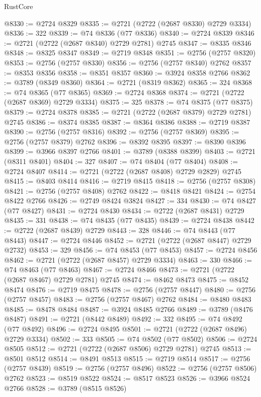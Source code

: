 \begin{lexlean}{RustCore}
\begin{coremodule}
@8330 := @2724 @8329
@8335 := @2721 (@2722 (@2687 @8330) @2729 @3334)
@8336 := 322
@8339 := @74 @8336 (@77 @8336)
@8340 := @2724 @8339
@8346 := @2721 (@2722 (@2687 @8340) @2729 @2781) @2745
@8347 := @8335 @8346
@8348 := @8325 @8347
@8349 := @2719 @8348
@8351 := @2756 (@2757 @8320)
@8353 := @2756 (@2757 @8330)
@8356 := @2756 (@2757 @8340) @2762
@8357 := @8353 @8356
@8358 := @8351 @8357
@8360 := @3924 @8358 @2766
@8362 := @3789 (@8349 @8360)
@8364 := @2721 (@8319 @8362)
@8365 := 324
@8368 := @74 @8365 (@77 @8365)
@8369 := @2724 @8368
@8374 := @2721 (@2722 (@2687 @8369) @2729 @3334)
@8375 := 325
@8378 := @74 @8375 (@77 @8375)
@8379 := @2724 @8378
@8385 := @2721 (@2722 (@2687 @8379) @2729 @2781) @2745
@8386 := @8374 @8385
@8387 := @8364 @8386
@8388 := @2719 @8387
@8390 := @2756 (@2757 @8316)
@8392 := @2756 (@2757 @8369)
@8395 := @2756 (@2757 @8379) @2762
@8396 := @8392 @8395
@8397 := @8390 @8396
@8399 := @3966 @8397 @2766
@8401 := @3789 (@8388 @8399)
@8403 := @2721 (@8311 @8401)
@8404 := 327
@8407 := @74 @8404 (@77 @8404)
@8408 := @2724 @8407
@8414 := @2721 (@2722 (@2687 @8408) @2729 @2829) @2745
@8415 := @8403 @8414
@8416 := @2719 @8415
@8418 := @2756 (@2757 @8308)
@8421 := @2756 (@2757 @8408) @2762
@8422 := @8418 @8421
@8424 := @2754 @8422 @2766
@8426 := @2749 @8424 @3824
@8427 := 334
@8430 := @74 @8427 (@77 @8427)
@8431 := @2724 @8430
@8434 := @2722 (@2687 @8431) @2729
@8435 := 331
@8438 := @74 @8435 (@77 @8435)
@8439 := @2724 @8438
@8442 := @2722 (@2687 @8439) @2729
@8443 := 328
@8446 := @74 @8443 (@77 @8443)
@8447 := @2724 @8446
@8452 := @2721 (@2722 (@2687 @8447) @2729 @2732)
@8453 := 329
@8456 := @74 @8453 (@77 @8453)
@8457 := @2724 @8456
@8462 := @2721 (@2722 (@2687 @8457) @2729 @3334)
@8463 := 330
@8466 := @74 @8463 (@77 @8463)
@8467 := @2724 @8466
@8473 := @2721 (@2722 (@2687 @8467) @2729 @2781) @2745
@8474 := @8462 @8473
@8475 := @8452 @8474
@8476 := @2719 @8475
@8478 := @2756 (@2757 @8447)
@8480 := @2756 (@2757 @8457)
@8483 := @2756 (@2757 @8467) @2762
@8484 := @8480 @8483
@8485 := @8478 @8484
@8487 := @3924 @8485 @2766
@8489 := @3789 (@8476 @8487)
@8491 := @2721 (@8442 @8489)
@8492 := 332
@8495 := @74 @8492 (@77 @8492)
@8496 := @2724 @8495
@8501 := @2721 (@2722 (@2687 @8496) @2729 @3334)
@8502 := 333
@8505 := @74 @8502 (@77 @8502)
@8506 := @2724 @8505
@8512 := @2721 (@2722 (@2687 @8506) @2729 @2781) @2745
@8513 := @8501 @8512
@8514 := @8491 @8513
@8515 := @2719 @8514
@8517 := @2756 (@2757 @8439)
@8519 := @2756 (@2757 @8496)
@8522 := @2756 (@2757 @8506) @2762
@8523 := @8519 @8522
@8524 := @8517 @8523
@8526 := @3966 @8524 @2766
@8528 := @3789 (@8515 @8526)

\end{coremodule}
\end{lexlean}
